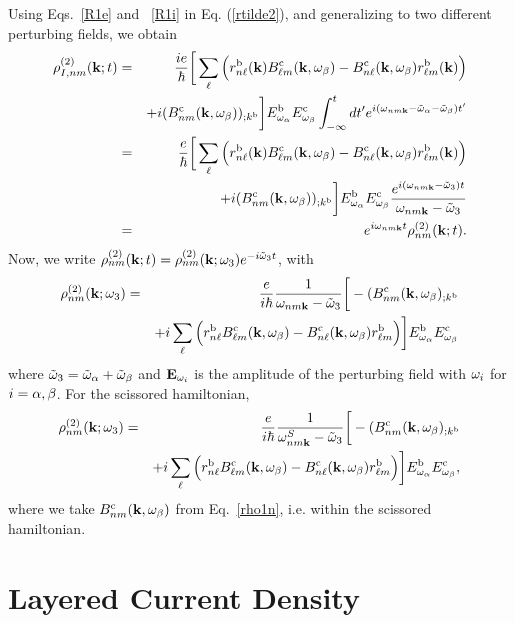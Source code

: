\documentclass{article}
\begin{document}
Using Eqs.~\eqref{R1e} and ~\eqref{R1i} in Eq. (\ref{rtilde2}),
and generalizing to two different perturbing fields,
we obtain
\begin{eqnarray}\label{rtilde33}
{\rho}^{(2)}_{I,nm}(\mathbf{k};t)
&=&
\frac{ie}{\hbar}
\bigg[
\sum_{\ell}
\Big(
r^{\mathrm{b}}_{n\ell}(\mathbf{k})
B^{\mathrm{c}}_{\ell m}(\mathbf{k},\omega_\beta)
-
B^{\mathrm{c}}_{n\ell}(\mathbf{k},\omega_\beta)
r^{\mathrm{b}}_{\ell m}(\mathbf{k})
\Big)
\nonumber \\
&&+
i
(B^{\mathrm{c}}_{nm}(\mathbf{k},\omega_\beta))_{;k^{\mathrm{b}}}
\bigg]
E^{\mathrm{b}}_{\omega_\alpha}E_{\omega_\beta}^{\mathrm{c}}
\int_{-\infty}^t dt'
e^{i(\omega_{nm\mathbf{k}}-\tilde\omega_\alpha-\tilde\omega_\beta)t'}
\nonumber \\
&=&
\frac{e}{\hbar}
\bigg[
\sum_{\ell}
\Big(
r^{\mathrm{b}}_{n\ell}(\mathbf{k})
B^{\mathrm{c}}_{\ell m}(\mathbf{k},\omega_\beta)
-
B^{\mathrm{c}}_{n\ell}(\mathbf{k},\omega_\beta)
r^{\mathrm{b}}_{\ell m}(\mathbf{k})
\Big)
\nonumber \\
&&+
i
(B^{\mathrm{c}}_{nm}(\mathbf{k},\omega_\beta))_{;k^{\mathrm{b}}}
\bigg]
E^{\mathrm{b}}_{\omega_\alpha}E_{\omega_\beta}^{\mathrm{c}}
\frac{e^{i(\omega_{nm\mathbf{k}}-\tilde\omega_3)t}}
{\omega_{nm\mathbf{k}}-\tilde\omega_3}
\nonumber \\
&=&
e^{i\omega_{nm\mathbf{k}}t}
\rho_{nm}^{(2)}(\mathbf{k};t)
.
\end{eqnarray}
Now, we write
$\rho_{nm}^{(2)}(\mathbf{k};t)=\rho_{nm}^{(2)}(\mathbf{k};\omega_3)e^{-i\tilde\omega_3 t}$,
with
\begin{eqnarray}\label{rho2}
{\rho}_{nm}^{(2)}(\mathbf{k};\omega_3)&=&\frac{e}{i\hbar}\frac{1}{\omega_{nm\mathbf{k}}-\tilde\omega_3}
\bigg[-(B_{nm}^{\mathrm{c}}(\mathbf{k},\omega_\beta)_{;k^{\mathrm{b}}}
\nonumber \\
&&
+i\sum_\ell\Big(r_{n\ell}^{\mathrm{b}}B_{\ell m}^{\mathrm{c}}(\mathbf{k},\omega_\beta) - B_{n\ell}^{\mathrm{c}}(\mathbf{k},\omega_\beta)
  r_{\ell m}^{\mathrm{b}}\Big)
\bigg] 
E^{\mathrm{b}}_{\omega_\alpha}E_{\omega_\beta}^{\mathrm{c}}
\end{eqnarray} 
where $\tilde\omega_3=\tilde\omega_\alpha+\tilde\omega_\beta$ and $\mathbf{E}_{\omega_i}$ is the amplitude of the perturbing
field with $\omega_i$ for $i=\alpha,\beta$. 
 For the scissored hamiltonian,
\begin{eqnarray}\label{rho2n}
{\rho}_{nm}^{(2)}(\mathbf{k};\omega_3)&=&\frac{e}{i\hbar}\frac{1}{\omega^S_{nm\mathbf{k}}-\tilde\omega_3}
\bigg[-(B_{nm}^{\mathrm{c}}(\mathbf{k},\omega_\beta)_{;k^{\mathrm{b}}}
\nonumber \\
&&
+i\sum_\ell\Big(r_{n\ell}^{\mathrm{b}}B_{\ell m}^{\mathrm{c}}(\mathbf{k},\omega_\beta) - B_{n\ell}^{\mathrm{c}}(\mathbf{k},\omega_\beta)
  r_{\ell m}^{\mathrm{b}}\Big)
\bigg]
E^{\mathrm{b}}_{\omega_\alpha}E_{\omega_\beta}^{\mathrm{c}}
,
\end{eqnarray}
where we take $B_{nm}^{\mathrm{c}}(\mathbf{k},\omega_\beta)$ 
from Eq.~\eqref{rho1n}, i.e. within the scissored
hamiltonian. 


\section{Layered Current Density}\label{cd}
\end{document}
